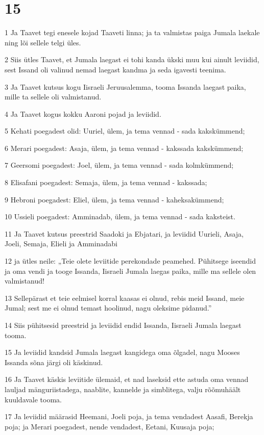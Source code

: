 \chapter{15}

\par 1 Ja Taavet tegi enesele kojad Taaveti linna; ja ta valmistas paiga Jumala laekale ning lõi sellele telgi üles.
\par 2 Siis ütles Taavet, et Jumala laegast ei tohi kanda ükski muu kui ainult leviidid, sest Issand oli valinud nemad laegast kandma ja seda igavesti teenima.
\par 3 Ja Taavet kutsus kogu Iisraeli Jeruusalemma, tooma Issanda laegast paika, mille ta sellele oli valmistanud.
\par 4 Ja Taavet kogus kokku Aaroni pojad ja leviidid.
\par 5 Kehati poegadest olid: Uuriel, ülem, ja tema vennad - sada kakskümmend;
\par 6 Merari poegadest: Asaja, ülem, ja tema vennad - kakssada kakskümmend;
\par 7 Geersomi poegadest: Joel, ülem, ja tema vennad - sada kolmkümmend;
\par 8 Elisafani poegadest: Semaja, ülem, ja tema vennad - kakssada;
\par 9 Hebroni poegadest: Eliel, ülem, ja tema vennad - kaheksakümmend;
\par 10 Ussieli poegadest: Amminadab, ülem, ja tema vennad - sada kaksteist.
\par 11 Ja Taavet kutsus preestrid Saadoki ja Ebjatari, ja leviidid Uurieli, Asaja, Joeli, Semaja, Elieli ja Amminadabi
\par 12 ja ütles neile: „Teie olete leviitide perekondade peamehed. Pühitsege iseendid ja oma vendi ja tooge Issanda, Iisraeli Jumala laegas paika, mille ma sellele olen valmistanud!
\par 13 Sellepärast et teie eelmisel korral kaasas ei olnud, rebis meid Issand, meie Jumal; sest me ei olnud temast hoolinud, nagu oleksime pidanud.”
\par 14 Siis pühitsesid preestrid ja leviidid endid Issanda, Iisraeli Jumala laegast tooma.
\par 15 Ja leviidid kandsid Jumala laegast kangidega oma õlgadel, nagu Mooses Issanda sõna järgi oli käskinud.
\par 16 Ja Taavet käskis leviitide ülemaid, et nad laseksid ette astuda oma vennad lauljad mänguriistadega, naablite, kannelde ja simblitega, valju rõõmuhäält kuuldavale tooma.
\par 17 Ja leviidid määrasid Heemani, Joeli poja, ja tema vendadest Aasafi, Berekja poja; ja Merari poegadest, nende vendadest, Eetani, Kuusaja poja;

